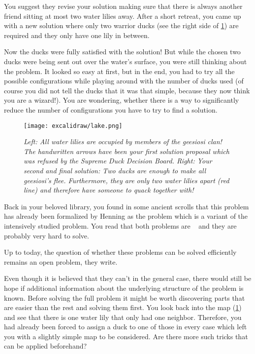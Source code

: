 You suggest they revise your solution making sure that there is always another friend sitting at most two water lilies away. After a short retreat, you came up with a new solution where only two warrior ducks (see the right side of \cref{fig:duck-lake}) are required and they only have one lily in between. 

Now the ducks were fully satisfied with the solution! But while the chosen two ducks were being sent out over the water's surface, you were still thinking about the problem.
It looked so easy at first, but in the end, you had to try all the possible configurations while playing around with the number of ducks used (of course you did not tell the ducks that it was that simple, because they now think you are a wizard!). 
You are wondering, whether there is a way to significantly reduce the number of configurations you have to try to find a solution.

\begin{figure}[t]
    \centering
    \texttt{[image: excalidraw/lake.png]}
    \caption[Introductions: Merganser Lake. Own Drawing. Embedded icons under public domain from {\href{https://creazilla.com/}{https://creazilla.com/}}]{\textit{Left: All water lilies are occupied by members of the \textit{geesiosi} clan! The handwritten arrows have been your first solution proposal which was refused by the \textit{Supreme Duck Decision Board}.
    Right: Your second and final solution: Two ducks are enough to make all \textit{geesiosi}'s flee. Furthermore, they are only two water lilies apart (red line) and therefore have someone to quack together with!}}
    \label{fig:duck-lake}
\end{figure}


Back in your beloved library, you found in some ancient scrolls that this problem has already been formalized by Henning \cite{Henning2019} as the \sdom problem which is a variant of the intensively studied \dom problem. 
You read that both problems are \NPc~\cite{Garey1979,Henning2019} and they are probably very hard to solve.

Up to today, the question of whether these \NPc problems can be solved efficiently remains an open problem, they write. 

Even though it is believed that they can't in the general case, there would still be hope if additional information about the underlying structure of the problem is known. 
Before solving the full problem it might be worth discovering parts that are easier than the rest and solving them first. You look back into the map (\cref{fig:duck-lake}) and see that there is one water lily that only had one neighbor.
Therefore, you had already been forced to assign a duck to one of those in every case which left you with a slightly simple map to be considered. Are there more such tricks that can be applied beforehand?

